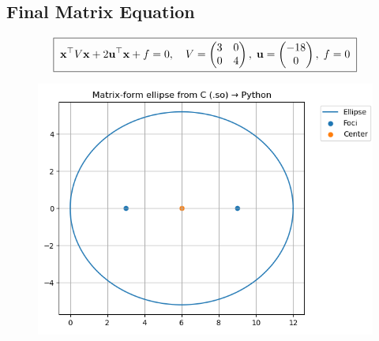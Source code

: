 \documentclass[12pt]{article}
\begin{document}
\subsection*{Final Matrix Equation}
\begin{align}
\boxed{ \; \mathbf{x}^\top V \mathbf{x} + 2 \mathbf{u}^\top \mathbf{x} + f = 0, \quad
V = \begin{pmatrix}3 & 0 \\ 0 & 4\end{pmatrix}, \;
\mathbf{u} = \begin{pmatrix}-18 \\ 0\end{pmatrix}, \;
f = 0 \; }
\end{align}

\begin{figure}[H]
    \centering
    \includegraphics[width=0.9\columnwidth]{figs/ellipse.png}
    \caption{}
    \label{fig:placeholder}
\end{figure}
\end{document}
